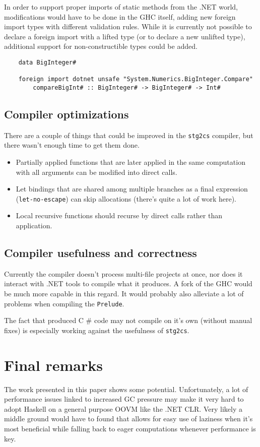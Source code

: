 \documentclass[en]{pracamgr}
\newcommand{\shrp}{%
  {\fontfamily{ppl}\selectfont\#%
  }}
\begin{document}
In order to support proper imports of static methods from the .NET world, modifications would have
to be done in the GHC itself, adding new foreign import types with different validation rules.
While it is currently not possible to declare a foreign import with a lifted type (or to declare a new unlifted type),
additional support for non-constructible types could be added.

\begin{verbatim}
    data BigInteger#

    foreign import dotnet unsafe "System.Numerics.BigInteger.Compare"
        compareBigInt# :: BigInteger# -> BigInteger# -> Int#
\end{verbatim}

\subsection{Compiler optimizations}
There are a couple of things that could be improved in the \texttt{stg2cs} compiler, but there wasn't
enough time to get them done.
\begin{itemize}
    \item Partially applied functions that are later applied in the same computation
            with all arguments can be modified into direct calls.
    \item Let bindings that are shared among multiple branches as a final expression (\texttt{let-no-escape})
            can skip allocations (there's quite a lot of work here).
    \item Local recursive functions should recurse by direct calls rather than application.
\end{itemize}

\subsection{Compiler usefulness and correctness}
Currently the compiler doesn't process multi-file projects at once, nor does it interact with .NET tools
to compile what it produces. A fork of the GHC would be much more capable in this regard. It would probably
also alleviate a lot of problems when compiling the \texttt{Prelude}.

The fact that produced C\shrp{} code may not compile on it's own (without manual fixes) is especially
working against the usefulness of \texttt{stg2cs}.

\section{Final remarks}
The work presented in this paper shows some potential.
Unfortunately, a lot of performance issues linked to increased
GC pressure may make it very hard to adopt Haskell on a general
purpose OOVM like the .NET CLR.
Very likely a middle ground would have to found that allows for
easy use of laziness when it's most beneficial while falling back
to eager computations whenever performance is key.
\end{document}
